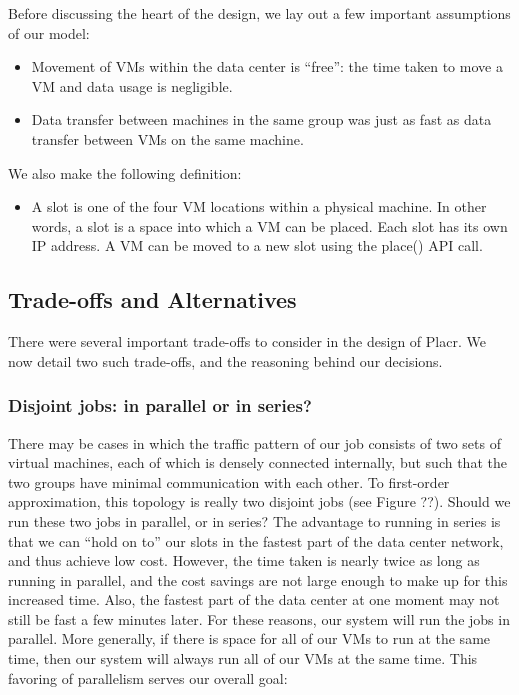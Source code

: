 \documentclass[11pt]{article}
\begin{document}
Before discussing the heart of the design, we lay out a few important assumptions of our model:
\vspace{-4mm}
\begin{itemize}
  \item 
Movement of VMs within the data center is “free”: the time taken to move a VM and data usage is negligible.
  \item Data transfer between machines in the same group was just as fast as data transfer between VMs on the same machine.
\end{itemize}

We also make the following definition:
\vspace{-4mm}
\begin{itemize}
  \item 
A slot is one of the four VM locations within a physical machine.  In other words, a slot is a space into which a VM can be placed.  Each slot has its own IP address.  A VM can be moved to a new slot using the place() API call.
\end{itemize}

\subsection{Trade-offs and Alternatives}

There were several important trade-offs to consider in the design of Placr.  We now detail two such trade-offs, and the reasoning behind our decisions.

\subsubsection{Disjoint jobs: in parallel or in series?}

There may be cases in which the traffic pattern of our job consists of two sets of virtual machines, each of which is densely connected internally, but such that the two groups have minimal communication with each other.  To first-order approximation, this topology is really two disjoint jobs (see Figure ??).  Should we run these two jobs in parallel, or in series?  The advantage to running in series is that we can “hold on to” our slots in the fastest part of the data center network, and thus achieve low cost.  However, the time taken is nearly twice as long as running in parallel, and the cost savings are not large enough to make up for this increased time.  Also, the fastest part of the data center at one moment may not still be fast a few minutes later.  For these reasons, our system will run the jobs in parallel.  More generally, if there is space for all of our VMs to run at the same time, then our system will always run all of our VMs at the same time.  This favoring of parallelism serves our overall goal:
\end{document}
